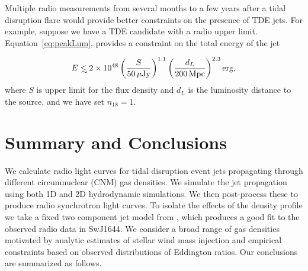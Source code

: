 \documentclass[usenatbib,fleqn]{mnras}
\newcommand\lsim{\mathrel{\rlap{\lower4pt\hbox{\hskip1pt$\sim$}}
    \raise1pt\hbox{$<$}}}
\begin{document}
Multiple radio measurements from several months to a few years after a
tidal disruption flare would provide better constraints on the
presence of TDE jets. For example, suppose we have a TDE candidate
with a radio upper limit. Equation~\eqref{eq:peakLum}, provides a
constraint on the total energy of the jet


\begin{equation}
E\lsim 2 \times 10^{48} \left(\frac{S}{50 \,\mu{\rm Jy}}\right)^{1.1}
  \left(\frac{d_L}{200 \,{\rm Mpc}}\right)^{2.3} {\rm erg},
\end{equation}
%
where $S$ is upper limit for the flux density and $d_L$ is the
luminosity distance to the source, and we have set $n_{18}=1$. 

\section{Summary and Conclusions}
\label{sec:conc}

We calculate radio light curves for tidal disruption event jets
propagating through different circumnuclear (CNM) gas densities. We
simulate the jet propagation using both 1D and 2D hydrodynamic
simulations. We then post-process these to produce radio synchrotron
light curves. To isolate the effects of the density profile we take a
fixed two component jet model from \citet{Mimica+2015}, which produces
a good fit to the observed radio data in SwJ1644. We
consider a broad range of gas densities motivated by analytic
estimates of stellar wind mass injection and empirical constraints
based on observed distributions of Eddington ratios. Our conclusions
are summarized as follows.
\end{document}
